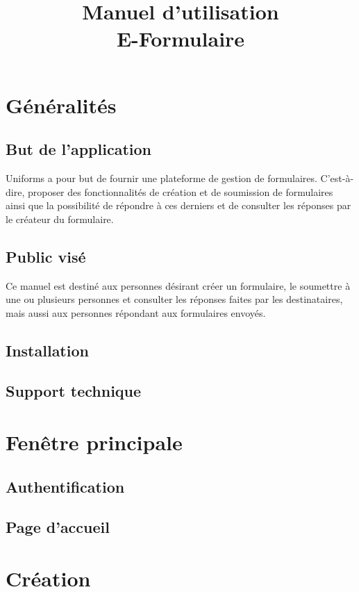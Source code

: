 \documentclass[a4paper,11pt,final]{report}
\title{\textbf{Manuel d'utilisation}\\E-Formulaire}
\author{}
\date{}
\begin{document}
\maketitle
\setcounter{page}{2}
\tableofcontents 
\chapter{Généralités}
\section{But de l'application}
Uniforms a pour but de fournir une plateforme de gestion de formulaires. C'est-à-dire, proposer des fonctionnalités de création et de soumission de formulaires ainsi que la possibilité de répondre à ces derniers et de consulter les réponses par le créateur du formulaire.

\section{Public visé}
Ce manuel est destiné aux personnes désirant créer un formulaire, le soumettre à une ou plusieurs personnes et consulter les réponses faites par les destinataires, mais aussi aux personnes répondant aux formulaires envoyés.

\section{Installation}

\section{Support technique}

\chapter{Fenêtre principale}
\section{Authentification}
\section{Page d'accueil}

\chapter{Création}
\end{document}
